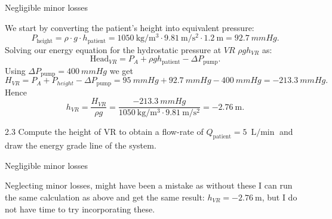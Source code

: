   \begin{assumptions}
    \item Negligible minor losses
  \end{assumptions}

  \begin{derivation}
    We start by converting the patient's height into equivalent pressure:
    \begin{equation*}
      P_{\text{height}} = \rho \cdot g \cdot h_{\text{patient}} = \qty{1050}{\kg\per\m^3} \cdot \qty{9,81}{\m\per\s^2}  \cdot \qty{1,2}{\m} = \qty{92,7}{mmHg} 
    .\end{equation*}
    Solving our energy equation for the hydrostatic pressure at $VR$ $\rho g h_{VR}$ as:
    \begin{equation*}
      \mathrm{Head}_{VR} = P_A + \rho g h_{\text{patient}} - \Delta P_{\text{pump}}
    .\end{equation*}
    Using $\Delta P_{\text{pump}} = \qty{400}{mmHg}$ we get
    \begin{equation*}
      H_{VR} = P_A + P_{height} - \Delta P_{\text{pump}} =  \qty{95}{mmHg} + \qty{92,7}{mmHg} - \qty{400}{mmHg} = \qty{-213,3}{mmHg} 
    .\end{equation*}
    Hence
    \begin{equation*}
      h_{VR} = \frac{H_{VR}}{\rho g} = \frac{- \qty{213,3}{mmHg}}{\qty{1050}{\kg\per\m^3} \cdot \qty{9,81}{\m\per\s^2} } = - \qty{2,76}{\m} 
    .\end{equation*}
  \end{derivation}


\begin{problem}{2.3}
  Compute the height of VR to obtain a flow-rate of $Q_{\mathrm{patient}} = \qty{5}{\L\per\min} $ and draw the energy grade line of the system.
\end{problem}

\begin{assumptions}
    \item Negligible minor losses
\end{assumptions}

\begin{derivation}
  Neglecting minor losses, might have been a mistake as without these I can run the same calculation as above and get the same result: $h_{VR} = \qty{-2,76}{\m}$, but I do not have time to try incorporating these.
\end{derivation}

